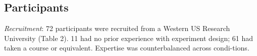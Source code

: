 \subsection{Participants}
\textit{Recruitment}: 72 participants were recruited from a Western US Research University (Table 2). 11 had no prior experience with experiment design; 61 had taken a course or equivalent. Expertise was counterbalanced across condi-tions.   

